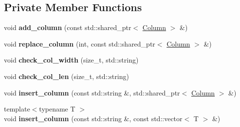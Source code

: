 \subsection*{Private Member Functions}
\begin{DoxyCompactItemize}
\item 
\mbox{\label{classDataFrame_1_1DataFrameProxy_a86f0a67b671260df875dd32d587d02c0}} 
void {\bfseries add\+\_\+column} (const std\+::shared\+\_\+ptr$<$ \hyperlink{classColumn}{Column} $>$ \&)
\item 
\mbox{\label{classDataFrame_1_1DataFrameProxy_a0706f91d14181e989b3d41836a8b5cc6}} 
void {\bfseries replace\+\_\+column} (int, const std\+::shared\+\_\+ptr$<$ \hyperlink{classColumn}{Column} $>$ \&)
\item 
\mbox{\label{classDataFrame_1_1DataFrameProxy_a93ea7598d298b57ba7c3226e72dfd42d}} 
void {\bfseries check\+\_\+col\+\_\+width} (size\+\_\+t, std\+::string)
\item 
\mbox{\label{classDataFrame_1_1DataFrameProxy_ae5a106a7251245dd7d0320172a775d43}} 
void {\bfseries check\+\_\+col\+\_\+len} (size\+\_\+t, std\+::string)
\item 
\mbox{\label{classDataFrame_1_1DataFrameProxy_a8cf3701f97648ea7762f524496c21e6b}} 
void {\bfseries insert\+\_\+column} (const std\+::string \&, std\+::shared\+\_\+ptr$<$ \hyperlink{classColumn}{Column} $>$ \&)
\item 
\mbox{\label{classDataFrame_1_1DataFrameProxy_accc578b4911e2b9744616dc3623e4b02}} 
{\footnotesize template$<$typename T $>$ }\\void {\bfseries insert\+\_\+column} (const std\+::string \&, const std\+::vector$<$ T $>$ \&)
\end{DoxyCompactItemize}
